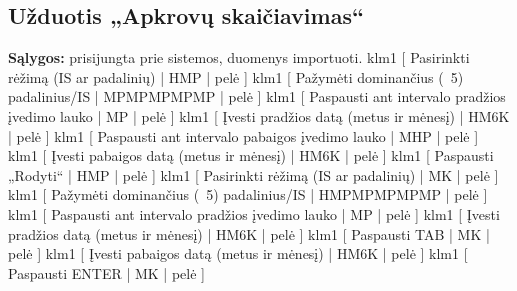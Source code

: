 \subsection{Užduotis „Apkrovų skaičiavimas“}
\textbf{Sąlygos:} prisijungta prie sistemos, duomenys importuoti.
\klm
{
  klm1 [ Pasirinkti rėžimą (IS ar padalinių) | HMP | pelė ]  
  klm1 [ Pažymėti dominančius (~5) padalinius/IS | MPMPMPMPMP | pelė ]  
  klm1 [ Paspausti ant intervalo pradžios įvedimo lauko | MP | pelė ]
  klm1 [ Įvesti pradžios datą (metus ir mėnesį) | HM6K | pelė ]
  klm1 [ Paspausti ant intervalo pabaigos įvedimo lauko | MHP | pelė ]
  klm1 [ Įvesti pabaigos datą (metus ir mėnesį) | HM6K | pelė ]
  klm1 [ Paspausti „Rodyti“ | HMP | pelė ]
}
{
  klm1 [ Pasirinkti rėžimą (IS ar padalinių) | MK | pelė ]  
  klm1 [ Pažymėti dominančius (~5) padalinius/IS | HMPMPMPMPMP | pelė ]  
  klm1 [ Paspausti ant intervalo pradžios įvedimo lauko | MP | pelė ]
  klm1 [ Įvesti pradžios datą (metus ir mėnesį) | HM6K | pelė ]
  klm1 [ Paspausti TAB | MK | pelė ]
  klm1 [ Įvesti pabaigos datą (metus ir mėnesį) | HM6K | pelė ]
  klm1 [ Paspausti ENTER | MK | pelė ]
}

